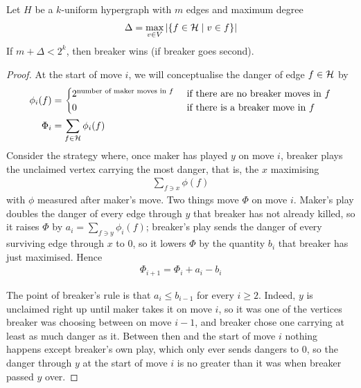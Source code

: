 \begin{boxlemma} \label{Ch2:Lemma:Maker_Breaker_Degree}
    Let $H$ be a $k$-uniform hypergraph with $m$ edges and maximum degree
    \begin{align*}
        \Delta = \max_{v \in V} \left\lvert \left\{ f \in \mathcal{H} \; \middle\vert \; v \in f \right\} \right\rvert
    \end{align*}
    If $m + \Delta < 2^k$, then breaker wins (if breaker goes second).
\end{boxlemma}
\begin{proof}
    At the start of move $i$, we will conceptualise the danger of edge $f \in \mathcal{H}$ by
    \begin{align*}
        \phi_i(f) &=
        \begin{cases}
            2^{\text{number of maker moves in $f$}} & \text{ if there are no breaker moves in $f$} \\
            0 & \text{ if there is a breaker move in $f$} \\
        \end{cases}
        \\
        \Phi_i &= \sum_{f \in \mathcal{H}} \phi_i(f)
    \end{align*}
    Consider the strategy where, once maker has played $y$ on move $i$, breaker plays the unclaimed vertex carrying the most danger, that is, the $x$ maximising
    \begin{align*}
        \sum_{f \ni x} \phi(f)
    \end{align*}
    with $\phi$ measured after maker's move. Two things move $\Phi$ on move $i$. Maker's play doubles the danger of every edge through $y$ that breaker has not already killed, so it raises $\Phi$ by $a_i = \sum_{f \ni y} \phi_i(f)$; breaker's play sends the danger of every surviving edge through $x$ to $0$, so it lowers $\Phi$ by the quantity $b_i$ that breaker has just maximised. Hence
    \begin{align*}
        \Phi_{i + 1} = \Phi_i + a_i - b_i
    \end{align*}

    The point of breaker's rule is that $a_i \leq b_{i - 1}$ for every $i \geq 2$. Indeed, $y$ is unclaimed right up until maker takes it on move $i$, so it was one of the vertices breaker was choosing between on move $i - 1$, and breaker chose one carrying at least as much danger as it. Between then and the start of move $i$ nothing happens except breaker's own play, which only ever sends dangers to $0$, so the danger through $y$ at the start of move $i$ is no greater than it was when breaker passed $y$ over.


\end{proof}
